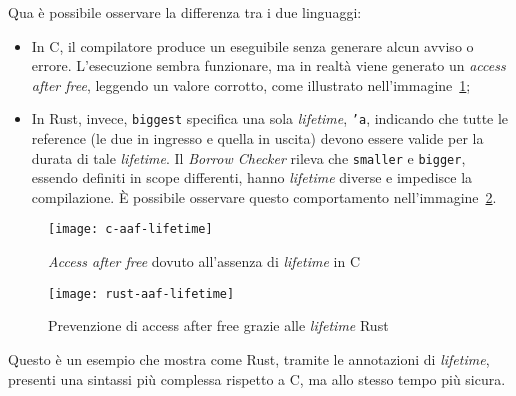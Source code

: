 Qua è possibile osservare la differenza tra i due linguaggi:
\begin{itemize}
    \item In C, il compilatore produce un eseguibile senza generare alcun avviso o errore. L'esecuzione sembra funzionare, ma in realtà viene generato un \textit{access after free}, leggendo un valore corrotto, come illustrato nell'immagine~\ref{c:aaf-lifetime};
    \item In Rust, invece, \texttt{biggest} specifica una sola \textit{lifetime}, \texttt{'a}, indicando che tutte le reference (le due in ingresso e quella in uscita) devono essere valide per la durata di tale \textit{lifetime}. Il \textit{Borrow Checker} rileva che \texttt{smaller} e \texttt{bigger}, essendo definiti in scope differenti, hanno \textit{lifetime} diverse e impedisce la compilazione. È possibile osservare questo comportamento nell'immagine~\ref{rust:aaf-lifetime}.
\end{itemize}
\begin{figure}[htbp]
    \begin{center}
        \texttt{[image: c-aaf-lifetime]}
        \caption{\textit{Access after free} dovuto all'assenza di \textit{lifetime} in C}\label{c:aaf-lifetime}
    \end{center}
\end{figure}
\begin{figure}[htbp]
    \begin{center}
        \texttt{[image: rust-aaf-lifetime]}
        \caption{Prevenzione di {access after free} grazie alle \textit{lifetime} Rust}\label{rust:aaf-lifetime}
    \end{center}
\end{figure}
Questo è un esempio che mostra come Rust, tramite le annotazioni di \textit{lifetime}, presenti una sintassi più complessa rispetto a C, ma allo stesso tempo più sicura.

